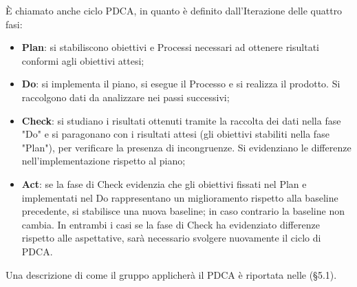 È chiamato anche ciclo PDCA, in quanto è definito dall'Iterazione delle quattro fasi:
 
\begin{itemize}
\item \textbf{Plan}: si stabiliscono obiettivi e Processi necessari ad ottenere risultati conformi agli obiettivi attesi;
\item \textbf{Do}: si implementa il piano, si esegue il Processo e si realizza il prodotto. Si raccolgono dati da analizzare nei passi successivi;
\item \textbf{Check}: si studiano i risultati ottenuti tramite la raccolta dei dati nella fase "Do" e si paragonano con i risultati attesi (gli obiettivi stabiliti nella fase "Plan"), per verificare la presenza di incongruenze. Si evidenziano le differenze nell'implementazione rispetto al piano;
\item \textbf{Act}: se la fase di Check evidenzia che gli obiettivi fissati nel Plan e implementati nel Do rappresentano un miglioramento rispetto alla baseline precedente, si stabilisce una nuova baseline; in caso contrario la baseline non cambia. In entrambi i casi se la fase di Check ha evidenziato differenze rispetto alle aspettative, sarà necessario svolgere nuovamente il ciclo di PDCA.
\end{itemize}
Una descrizione di come il gruppo applicherà il PDCA è riportata nelle \NormeDiProgetto (\S5.1).